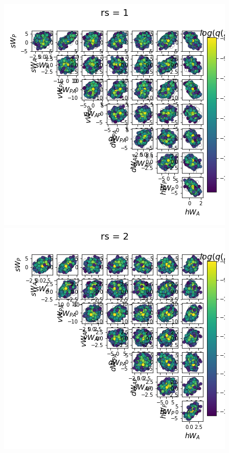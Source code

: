 \documentclass[11pt]{article}
\begin{document}
\begin{center}
\includegraphics[scale=0.33]{figs/Z_SC_full_c=0_p=50_rs=1.png}
\includegraphics[scale=0.33]{figs/Z_SC_full_c=0_p=50_rs=2.png}

\end{center}
\end{document}

